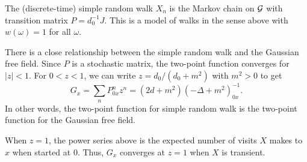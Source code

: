 \begin{example}
The (discrete-time) simple random walk $X_n$ is the Markov chain on $\mathcal{G}$ with
transition matrix $P = d_0^{-1} J$. This is a model of walks in the sense above
with $w(\omega) = 1$ for all $\omega$.

There is a close relationship between the
simple random walk and the Gaussian free field. Since $P$ is a stochastic matrix,
the two-point function converges for $|z| < 1$. For $0 < z < 1$, we can write
$z = d_0 / (d_0 + m^2)$ with $m^2 > 0$ to get
\begin{equation}
G_x = \sum_n P^n_{0x} z^n = (2 d + m^2) (-\Delta + m^2)^{-1}_{0x}.
\end{equation}
In other words, the two-point function for simple random walk is the two-point
function for the Gaussian free field.

When $z = 1$, the power series above is the expected number of visits $X$ makes
to $x$ when started at $0$. Thus, $G_x$ converges at $z = 1$ when $X$ is transient.
\end{example}



